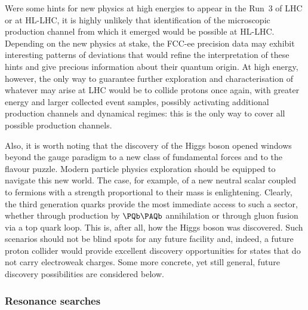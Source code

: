 Were some hints for new physics at high energies to appear in the Run~3 of LHC or at HL-LHC, 
it is highly unlikely that identification of the microscopic production channel from which it emerged would be possible at HL-LHC. 
Depending on the new physics at stake, 
the FCC-ee precision data may exhibit interesting patterns of deviations that 
would refine the interpretation of these hints and give precious information about their quantum origin. 
At high energy, however, the only way to guarantee further exploration and characterisation of whatever may arise at LHC 
would be to collide protons once again, with greater energy and larger collected event samples, 
possibly activating additional production channels and dynamical regimes: 
this is the only way to cover all possible production channels.

Also, it is worth noting that the discovery of the Higgs boson opened windows beyond the gauge paradigm 
to a new class of fundamental forces and to the flavour puzzle.  
Modern particle physics exploration should be equipped to navigate this new world.  
The case, for example, of a new neutral scalar coupled to fermions with a strength proportional to their mass is enlightening. 
Clearly, the third generation quarks provide the most immediate access to such a sector, 
whether through production by $\bbbar$ annihilation or through gluon fusion via a top quark loop.  
This is, after all, how the Higgs boson was discovered.  
Such scenarios should not be blind spots for any future facility and, indeed, 
a future proton collider would provide excellent discovery opportunities for states that do not carry electroweak charges.
%
Some more concrete, yet still general, future discovery possibilities are considered below.

\subsubsection{Resonance searches}

